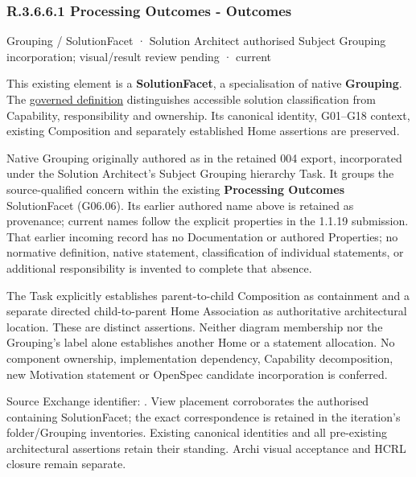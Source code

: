 \subsubsection*{R.3.6.6.1 Processing Outcomes - Outcomes}
\label{navigation:R.3.6.6.1}

\label{element:b05d68295ed141d6815aa56c8a3d3b39}
{\small Grouping / SolutionFacet · Solution Architect authorised Subject Grouping incorporation; visual/result review pending · current}\par

This existing element is a \textbf{SolutionFacet}, a specialisation of native
\textbf{Grouping}. The \href{\detokenize{../../../../../../../governance/continuum-representation.md#solutionfacet-classification--1119-candidate}}{governed definition}
distinguishes accessible solution classification from Capability, responsibility
and ownership. Its canonical identity, G01–G18 context, existing Composition
and separately established Home assertions are preserved.



Native Grouping originally authored as \texttt{} in the retained 004 export,
incorporated under the Solution Architect's Subject Grouping hierarchy Task.
It groups the source-qualified \texttt{} concern within
the existing \textbf{Processing Outcomes} SolutionFacet (G06.06). Its earlier authored name above is retained as provenance; current names
follow the explicit properties in the 1.1.19 submission.
That earlier incoming record has no Documentation or authored Properties; no normative
definition, native statement, classification of individual statements, or
additional responsibility is invented to complete that absence.



The Task explicitly establishes parent-to-child Composition as containment and
a separate directed child-to-parent Home Association as authoritative architectural
location. These are distinct assertions. Neither diagram membership nor the
Grouping's label alone establishes another Home or a statement allocation.
No component ownership, implementation dependency, Capability decomposition,
new Motivation statement or OpenSpec candidate incorporation is conferred.



Source Exchange identifier: \texttt{}. View placement corroborates
the authorised containing SolutionFacet; the exact correspondence is retained in the
iteration's folder/Grouping inventories. Existing canonical identities and all
pre-existing architectural assertions retain their standing. Archi visual
acceptance and HCRL closure remain separate.


